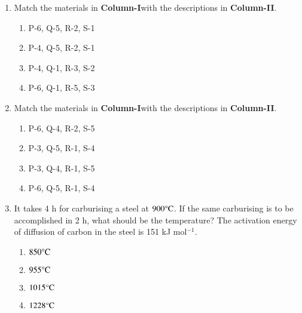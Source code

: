 \documentclass[journal]{IEEEtran}
\begin{document}
\begin{enumerate}
\item Match the materials in \textbf{Column-I}with the descriptions in \textbf{Column-II}.
\begin{table}[h]
    \centering
    
    \label{tab:my_label}
\end{table}
\begin{multicols}{2}
\begin{enumerate}
    \item P-6, Q-5, R-2, S-1  
    \item P-4, Q-5, R-2, S-1
    \item P-4, Q-1, R-3, S-2 
    \item P-6, Q-1, R-5, S-3
\end{enumerate}
\end{multicols}

\item Match the materials in \textbf{Column-I}with the descriptions in \textbf{Column-II}.
\begin{table}[h]
    \centering
    
    \label{tab:my_label}
\end{table}
\begin{multicols}{2}
\begin{enumerate}
    \item P-6, Q-4, R-2, S-5
    \item P-3, Q-5, R-1, S-4
    \item P-3, Q-4, R-1, S-5
    \item P-6, Q-5, R-1, S-4
\end{enumerate}
\end{multicols}

\item It takes 4 h for carburising a steel at $900\degree\text{C} $. If the same carburising is to be accomplished in 2 h, what should be the temperature? The activation energy of diffusion of carbon in the steel is 151 kJ mol$^{-1}$.
\begin{multicols}{4}
\begin{enumerate}
    \item $850\degree\text{C}$
    \item $955\degree\text{C}$
    \item $1015\degree\text{C}$
    \item $1228\degree\text{C}$
\end{enumerate}
\end{multicols}


\end{enumerate}
\end{document}
